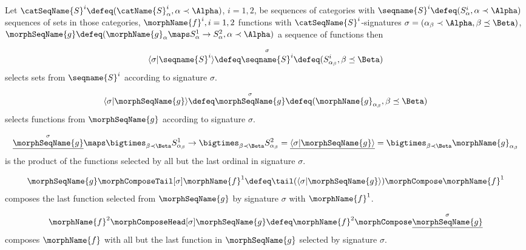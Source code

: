 \documentclass{article}
\begin{document}
\begin{definition}
\label{def:sigop}
Let $\catSeqName{S}^i \defeq (\catName{S}^i_\alpha, \alpha \prec \Alpha)$, $i=1,2$,
be sequences of categories with $\seqname{S}^i \defeq (S^i_\alpha, \alpha \prec
\Alpha)$ sequences of sets in those categories, $\morphName{f}^i,i=1,2$ functions with
$\catSeqName{S}^i$-signatures $\sigma = (\alpha_\beta \prec \Alpha, \beta \preceq \Beta)$,
$\morphSeqName{g} \defeq (\morphName{g}_\alpha \maps S^1_\alpha
\to S^2_\alpha, \alpha \prec \Alpha)$
a sequence of functions then

\begin{equation}
\langle \sigma | \seqname{S}^i \rangle
\defeq \overset{\sigma}{\seqname{S}^i} \defeq (S^i_{\alpha_\beta}, \beta \preceq \Beta)
\end{equation}
selects sets from $\seqname{S}^i$ according to signature $\sigma$.

\begin{equation}
\langle \sigma | \morphSeqName{g} \rangle
\defeq \overset{\sigma}{\morphSeqName{g}} \defeq (\morphName{g}_{\alpha_\beta}, \beta \preceq \Beta)
\end{equation}
selects functions from $\morphSeqName{g}$ according to signature $\sigma$.

\begin{equation}
\overset{\sigma}{\underline{\morphSeqName{g}}} \maps
\bigtimes_{\beta \prec \Beta} S^1_{\alpha_\beta} \to
\bigtimes_{\beta \prec \Beta} S^2_{\alpha_\beta}
= \underline{\langle \sigma | \morphSeqName{g} \rangle} =
\bigtimes_{\beta \prec \Beta} \morphName{g}_{\alpha_\beta}
\end{equation}
is the product of the functions selected by all but the last ordinal in signature $\sigma$.

\begin{equation}
\morphSeqName{g} \morphComposeTail[\sigma] \morphName{f}^1 \defeq
\tail(\langle \sigma | \morphSeqName{g} \rangle) \morphCompose \morphName{f}^1
\end{equation}
composes the last function selected from $\morphSeqName{g}$ by signature
$\sigma$ with $\morphName{f}^1$.

\begin{equation}
  \morphName{f}^2 \morphComposeHead[\sigma] \morphSeqName{g} \defeq
  \morphName{f}^2 \morphCompose \underline{\overset{\sigma}{\morphSeqName{g}}}
\end{equation}
composes $\morphName{f}$ with all but the last function in
$\morphSeqName{g}$ selected by signature $\sigma$.
\end{definition}
\end{document}
